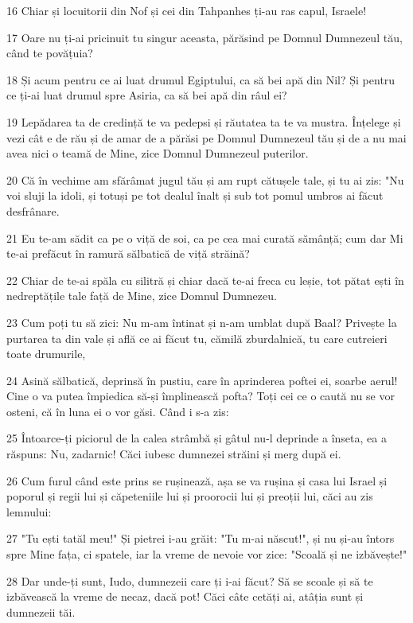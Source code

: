 \par 16 Chiar și locuitorii din Nof și cei din Tahpanhes ți-au ras capul, Israele!
\par 17 Oare nu ți-ai pricinuit tu singur aceasta, părăsind pe Domnul Dumnezeul tău, când te povățuia?
\par 18 Și acum pentru ce ai luat drumul Egiptului, ca să bei apă din Nil? Și pentru ce ți-ai luat drumul spre Asiria, ca să bei apă din râul ei?
\par 19 Lepădarea ta de credință te va pedepsi și răutatea ta te va mustra. Înțelege și vezi cât e de rău și de amar de a părăsi pe Domnul Dumnezeul tău și de a nu mai avea nici o teamă de Mine, zice Domnul Dumnezeul puterilor.
\par 20 Că în vechime am sfărâmat jugul tău și am rupt cătușele tale, și tu ai zis: "Nu voi sluji la idoli, și totuși pe tot dealul înalt și sub tot pomul umbros ai făcut desfrânare.
\par 21 Eu te-am sădit ca pe o viță de soi, ca pe cea mai curată sămânță; cum dar Mi te-ai prefăcut în ramură sălbatică de viță străină?
\par 22 Chiar de te-ai spăla cu silitră și chiar dacă te-ai freca cu leșie, tot pătat ești în nedreptățile tale față de Mine, zice Domnul Dumnezeu.
\par 23 Cum poți tu să zici: Nu m-am întinat și n-am umblat după Baal? Privește la purtarea ta din vale și află ce ai făcut tu, cămilă zburdalnică, tu care cutreieri toate drumurile,
\par 24 Asină sălbatică, deprinsă în pustiu, care în aprinderea poftei ei, soarbe aerul! Cine o va putea împiedica să-și împlinească pofta? Toți cei ce o caută nu se vor osteni, că în luna ei o vor găsi. Când i s-a zis:
\par 25 Întoarce-ți piciorul de la calea strâmbă și gâtul nu-l deprinde a înseta, ea a răspuns: Nu, zadarnic! Căci iubesc dumnezei străini și merg după ei.
\par 26 Cum furul când este prins se rușinează, așa se va rușina și casa lui Israel și poporul și regii lui și căpeteniile lui și proorocii lui și preoții lui, căci au zis lemnului:
\par 27 "Tu ești tatăl meu!" Și pietrei i-au grăit: "Tu m-ai născut!", și nu și-au întors spre Mine fața, ci spatele, iar la vreme de nevoie vor zice: "Scoală și ne izbăvește!"
\par 28 Dar unde-ți sunt, Iudo, dumnezeii care ți i-ai făcut? Să se scoale și să te izbăvească la vreme de necaz, dacă pot! Căci câte cetăți ai, atâția sunt și dumnezeii tăi.
